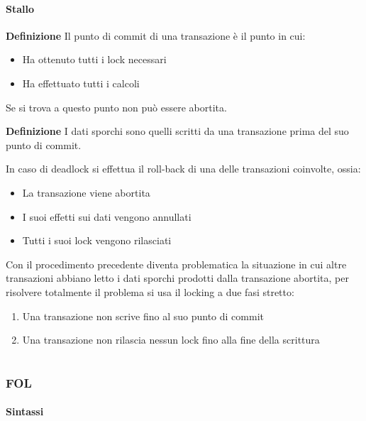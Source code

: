 \documentclass{article}
\begin{document}
\subsection{Stallo}

\textbf{Definizione} Il punto di commit di una transazione è il punto in cui:
\begin{itemize}
    \item Ha ottenuto tutti i lock necessari
    \item Ha effettuato tutti i calcoli
\end{itemize}
\noindent Se si trova a questo punto non può essere abortita.\newline

\noindent\textbf{Definizione} I dati sporchi sono quelli scritti da una transazione prima del suo punto di commit.\newline

\noindent In caso di deadlock si effettua il roll-back di una delle transazioni coinvolte, ossia:
\begin{itemize}
    \item La transazione viene abortita
    \item I suoi effetti sui dati vengono annullati
    \item Tutti i suoi lock vengono rilasciati\newline
\end{itemize}

\noindent Con il procedimento precedente diventa problematica la situazione in cui altre transazioni abbiano letto i dati sporchi prodotti dalla transazione abortita, per risolvere totalmente il problema si usa il locking a due fasi stretto:
\begin{enumerate}
    \item Una transazione non scrive fino al suo punto di commit
    \item Una transazione non rilascia nessun lock fino alla fine della scrittura
\end{enumerate}

\newpage
 
\part{}

\section{FOL}

\subsection{Sintassi}
\end{document}
